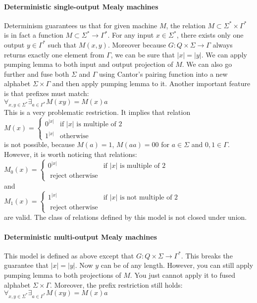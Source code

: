 \documentclass[12pt]{article}
\begin{document}
\paragraph{Deterministic single-output Mealy machines} Determinism guarantees us that for given machine $M$, the relation $M \subset \Sigma^* \times \Gamma^*$ is in fact a function $M \subset \Sigma^* \rightarrow \Gamma^*$. For any input $x \in \Sigma^*$, there exists only one output $y\in \Gamma^*$ such that $M(x,y)$. Moreover because $G: Q \times \Sigma \rightarrow \Gamma$ always returns exactly one element from $\Gamma$, we can be sure that $\vert x\vert = \vert y\vert$. We can apply pumping lemma to both input and output projection of $M$. We can also go further and fuse both $\Sigma$ and $\Gamma$ using Cantor's pairing function into a new alphabet $\Sigma \times \Gamma$ and then apply pumping lemma to it. Another important feature is that prefixes must match: \\
$\forall_{x,y\in \Sigma^*} \exists_{a \in \Gamma^* } M(xy)=M(x)a$ \\
This is a very problematic restriction. It implies that relation \\
$M(x) = \begin{cases}
0^{\vert x \vert} & \mbox{if } \vert x \vert \mbox{ is multiple of 2}   \\
1^{\vert x \vert}& \mbox{otherwise} 
\end{cases}$ \\
is not possible, because $M(a) = 1$, $M(aa) = 00$  for $a \in \Sigma$ and $0,1 \in \Gamma$. However, it is worth noticing that relations: \\
$M_0(x) = \begin{cases}
0^{\vert x \vert} & \mbox{if } \vert x \vert \mbox{ is multiple of 2}   \\
\mbox{ reject otherwise} 
\end{cases}$ \\
and  \\
$M_1(x) = \begin{cases}
1^{\vert x \vert} & \mbox{if } \vert x \vert \mbox{ is not multiple of 2}   \\
\mbox{ reject otherwise} 
\end{cases}$ \\
are valid. The class of relations defined by this model is not closed under union.

\paragraph{Deterministic multi-output Mealy machines} This model is defined as above except that $G: Q \times \Sigma \rightarrow \Gamma^*$. This breaks the guarantee that $\vert x\vert = \vert y\vert$. Now $y$ can be of any length. However, you can still apply pumping lemma to both projections of $M$. You just cannot apply it to fused alphabet $\Sigma \times \Gamma$. Moreover, the prefix restriction still holds: \\
$\forall_{x,y\in \Sigma^*} \exists_{a \in \Gamma^* } M(xy)=M(x)a$ \\
\end{document}
